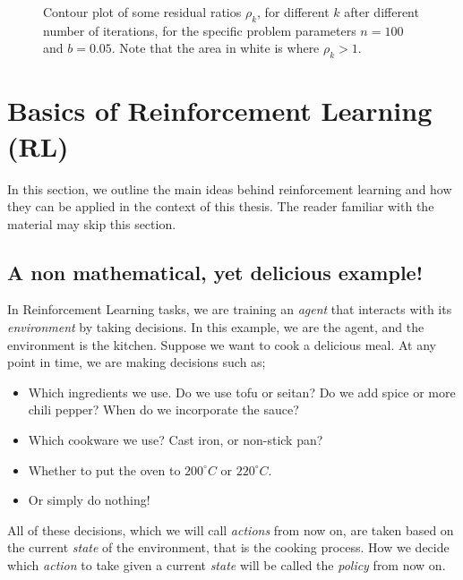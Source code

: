 \documentclass[
  letterpaper,
]{report}
\providecommand{\tightlist}{%
  \setlength{\itemsep}{0pt}\setlength{\parskip}{0pt}}\usepackage{longtable,booktabs,array}
\theoremstyle{definition}
\theoremstyle{plain}
\theoremstyle{definition}
\theoremstyle{remark}
\begin{document}
\begin{figure}
\begin{minipage}{0.50\linewidth}
{}


\end{minipage}%

\caption{\label{fig-res_ratio_comparison}Contour plot of some residual
ratios \(\rho_k\), for different \(k\) after different number of
iterations, for the specific problem parameters \(n = 100\) and
\(b=0.05\). Note that the area in white is where \(\rho_k > 1\).}

\end{figure}%


\chapter{Basics of Reinforcement Learning
(RL)}\label{basics-of-reinforcement-learning-rl}

In this section, we outline the main ideas behind reinforcement learning
and how they can be applied in the context of this thesis. The reader
familiar with the material may skip this section.

\section{A non mathematical, yet delicious
example!}\label{a-non-mathematical-yet-delicious-example}

In Reinforcement Learning tasks, we are training an \emph{agent} that
interacts with its \emph{environment} by taking decisions. In this
example, we are the agent, and the environment is the kitchen. Suppose
we want to cook a delicious meal. At any point in time, we are making
decisions such as;

\begin{itemize}
\tightlist
\item
  Which ingredients we use. Do we use tofu or seitan? Do we add spice or
  more chili pepper? When do we incorporate the sauce?
\item
  Which cookware we use? Cast iron, or non-stick pan?
\item
  Whether to put the oven to \(200^\circ C\) or \(220^\circ C\).
\item
  Or simply do nothing!
\end{itemize}

All of these decisions, which we will call \emph{actions} from now on,
are taken based on the current \emph{state} of the environment, that is
the cooking process. How we decide which \emph{action} to take given a
current \emph{state} will be called the \emph{policy} from now on.
\end{document}
